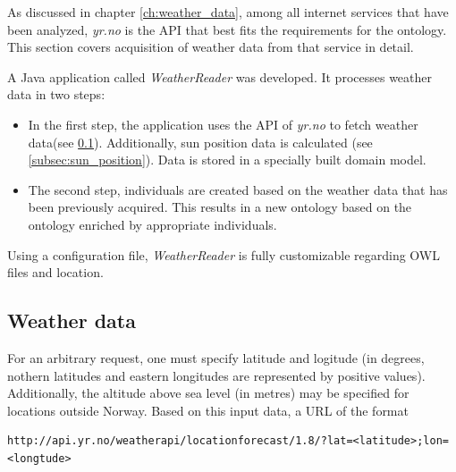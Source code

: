 As discussed in chapter \ref{ch:weather_data}, among all internet services that have been analyzed, \emph{yr.no} is the API that best fits the requirements for the \thinkhomeweather ontology. This section covers acquisition of weather data from that service in detail.

A Java application called \emph{WeatherReader} was developed. It processes weather data in two steps:

\begin{itemize}
  \item In the first step, the application uses the API of \emph{yr.no} to fetch weather data(see \ref{subsec:weather_data_yr_no}). Additionally, sun position data is calculated (see \ref{subsec:sun_position}). Data is stored in a specially built domain model. %
  \item The second step, individuals are created based on the weather data that has been previously acquired. This results in a new ontology based on the \thinkhomeweather ontology enriched by appropriate individuals.
\end{itemize}


Using a configuration file, \emph{WeatherReader} is fully customizable regarding OWL files and location.

\subsection{Weather data}
\label{subsec:weather_data_yr_no}


For an arbitrary request, one must specify latitude and logitude (in degrees, nothern latitudes and eastern longitudes are represented by positive values). Additionally, the altitude above sea level (in metres) may be specified for locations outside Norway. Based on this input data, a URL of the format

\lstset{frame=trbl}
\begin{lstlisting}
http://api.yr.no/weatherapi/locationforecast/1.8/?lat=<latitude>;lon=<longtude>
\end{lstlisting}

